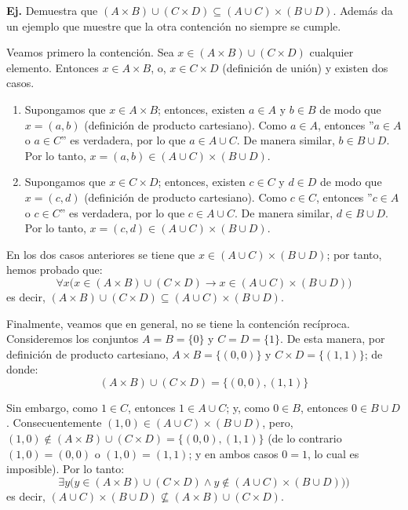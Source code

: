 \documentclass[letterpaper,DIV=14,headsepline,12pt]{scrartcl}
\makeatletter
\newcounter{Ejer}
\newcommand{\pts}{}
\newenvironment{ejercicio}[1]{\noindent
    \ifthenelse{\equal{#1}{1} \OR \equal{#1}{+1}}{\renewcommand{\pts}{\textbf{(#1 pt)}}}{\renewcommand{\pts}{\textbf{(#1 pts)}}}\textbf{Ej. \theEjer} \pts\stepcounter{Ejer}}{\vspace{.3cm}}
\renewenvironment{proof}[1][]{%
        \par\pushQED{\qed}%
        \normalfont\topsep6pt \partopsep0pt %
        \trivlist
        \item[\hskip\labelsep
                \textbf{\textit{Demostración.}}%
        ]#1
        }{%
        \popQED\endtrivlist\@endpefalse
    }
\makeatother
\begin{document}
    \begin{ejercicio}{2.5}
      Demuestra que \((A\times B)\cup(C\times D)\subseteq(A\cup C)\times(B\cup D)\).
      Además da un ejemplo que muestre que la otra contención no siempre se cumple.
    \end{ejercicio}
    \begin{proof}
        Veamos primero la contención. Sea $x \in (A \times B) \cup (C \times D)$ cualquier elemento. Entonces $x \in A \times B$, o, $x \in C \times D$ (definición de unión) y existen dos casos.
        \begin{enumerate}
            \item Supongamos que $x \in A \times B$; entonces, existen $a \in A$ y $b \in B$ de modo que $x=(a,b)$ (definición de producto cartesiano). Como $a \in A$, entonces ''$a \in A $ o $a \in C$'' es verdadera, por lo que $a \in A \cup C$. De manera similar, $b \in B \cup D$. Por lo tanto, $x=(a,b) \in (A\cup C) \times (B \cup D)$.
            \item Supongamos que $x \in C \times D$; entonces, existen $c \in C$ y $d \in D$ de modo que $x=(c,d)$ (definición de producto cartesiano). Como $c \in C$, entonces ''$c \in A$ o $c \in C$'' es verdadera, por lo que $c \in A \cup C$. De manera similar, $d \in B \cup D$. Por lo tanto, $x=(c,d) \in (A\cup C) \times (B \cup D)$.
        \end{enumerate}
        En los dos casos anteriores se tiene que $x \in (A \cup C) \times (B \cup D)$; por tanto, hemos probado que:
        \[ \forall x \big( x \in (A\times B)\cup(C\times D) \to x \in (A\cup C)\times(B\cup D) \big) \]
        es decir, $(A\times B)\cup(C\times D)\subseteq(A\cup C)\times(B\cup D)$.
        
        Finalmente, veamos que en general, no se tiene la contención recíproca. Consideremos los conjuntos $A=B=\{0\}$ y $C=D=\{1\}$. De esta manera, por definición de producto cartesiano, $A \times B = \{(0,0)\} $ y $ C \times D = \{(1,1)\}$; de donde:
        \[ (A\times B)\cup(C\times D) = \{(0,0),(1,1)\} \]
        
        Sin embargo, como $1 \in C$, entonces $1 \in A \cup C$; y, como $0 \in B$, entonces $0 \in B \cup D$. Consecuentemente $(1,0) \in (A\cup C)\times(B\cup D)$, pero, $(1,0) \notin (A\times B)\cup(C\times D) = \{(0,0),(1,1)\}$ (de lo contrario $(1,0)=(0,0)$ o $(1,0)=(1,1)$; y en ambos casos $0=1$, lo cual es imposible). Por lo tanto:
        \[ \exists y \big( y \in (A\times B)\cup(C\times D) \land y \notin (A\cup C)\times(B\cup D) \big) \big) \]
        es decir, $(A\cup C)\times(B\cup D) \not\subseteq (A\times B)\cup(C\times D)$.
    \end{proof}
\end{document}
